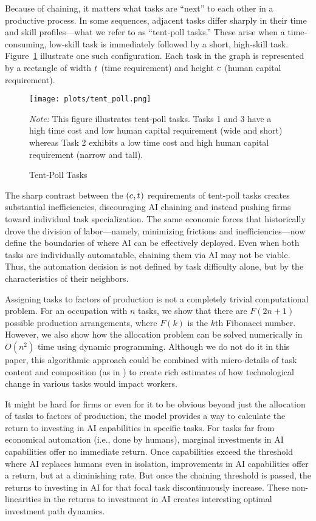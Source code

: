 \documentclass{article}
\theoremstyle{plain}
\theoremstyle{plain}
\begin{document}
Because of chaining, it matters what tasks are ``next'' to each other in a productive process.
In some sequences, adjacent tasks differ sharply in their time and skill profiles---what we refer to as ``tent‐poll tasks.''
These arise when a time‐consuming, low‐skill task is immediately followed by a short, high‐skill task.
Figure~\ref{fig:tent_poll} illustrate one such configuration.
Each task in the graph is represented by a rectangle of width $t_{}$ (time requirement) and height $c_{}$ (human capital requirement).
\begin{figure}[h]
  \caption{Tent‐Poll Tasks} 
  \label{fig:tent_poll}
  \begin{center}
    \texttt{[image: plots/tent\_poll.png]}
  \end{center}
  \begin{footnotesize}
    \emph{Note:} This figure illustrates tent‐poll tasks.  
    Tasks 1 and 3 have a high time cost and low human capital requirement (wide and short) whereas Task 2 exhibits a low time cost and high human capital requirement (narrow and tall).  
  \end{footnotesize}
\end{figure}
The sharp contrast between the $(c_{}, t_{})$ requirements of tent-poll tasks creates substantial inefficiencies, discouraging AI chaining and instead pushing firms toward individual task specialization.
The same economic forces that historically drove the division of labor---namely, minimizing frictions and inefficiencies---now define the boundaries of where AI can be effectively deployed.
Even when both tasks are individually automatable, chaining them via AI may not be viable.
Thus, the automation decision is not defined by task difficulty alone, but by the characteristics of their neighbors.

Assigning tasks to factors of production is not a completely trivial computational problem.
For an occupation with $n$ tasks, we show that there are $F(2n + 1)$ possible production arrangements, where $F(k)$ is the $k$th Fibonacci number.
However, we also show how the allocation problem can be solved numerically in $O(n^2)$ time using dynamic programming.
Although we do not do it in this paper, this algorithmic approach could be combined with micro-details of task content and composition (as in \cite{frey2017future, felten2021occupational, eloundou2023gpts}) to create rich estimates of how technological change in various tasks would impact workers.

It might be hard for firms or even for it to be obvious beyond just the allocation of tasks to factors of production, the model provides a way to calculate the return to investing in AI capabilities in specific tasks.
For tasks far from economical automation (i.e., done by humans), marginal investments in AI capabilities offer no immediate return.
Once capabilities exceed the threshold where AI replaces humans even in isolation, improvements in AI capabilities offer a return, but at a diminishing rate.
But once the chaining threshold is passed, the returns to investing in AI for that focal task discontinuously increase.
These non-linearities in the returns to investment in AI creates interesting optimal investment path dynamics.
\end{document}
